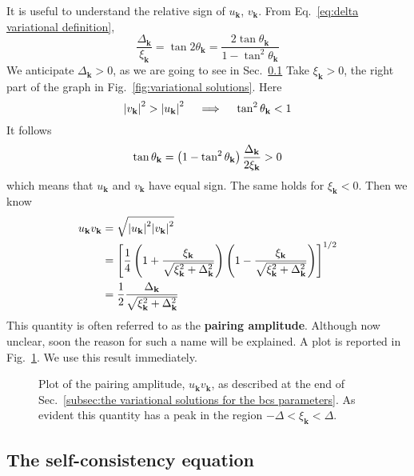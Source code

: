 It is useful to understand the relative sign of $u_\mathbf{k}$, $v_\mathbf{k}$. From Eq.~\eqref{eq:delta variational definition},
\[
	\frac{\Delta_\mathbf{k}}{\xi_\mathbf{k}} = \tan 2\theta_\mathbf{k} = \frac{2 \tan\theta_\mathbf{k}}{1 - \tan^2\theta_\mathbf{k}}
\]
We anticipate $\Delta_\mathbf{k} > 0$, as we are going to see in Sec.~\ref{subsec:the self consistency equation} Take $\xi_\mathbf{k}>0$, the right part of the graph in Fig.~\ref{fig:variational solutions}. Here
\[
	\abs{v_\mathbf{k}}^2 > \abs{u_\mathbf{k}}^2
	\quad\implies\quad
	\tan^2\theta_\mathbf{k} < 1
\]
It follows
\[
	\tan\theta_\mathbf{k} = \left({1-\tan^2\theta_\mathbf{k}}\right) \frac{\Delta_\mathbf{k}}{2\xi_\mathbf{k}} > 0
\]
which means that $u_\mathbf{k}$ and $v_\mathbf{k}$ have equal sign. The same holds for $\xi_\mathbf{k}<0$. Then we know
\begin{align}
	u_\mathbf{k} v_\mathbf{k} &= \sqrt{\abs{u_\mathbf{k}}^2 \abs{v_\mathbf{k}}^2} \nonumber \\
	&= \left[{\frac{1}{4} \left({1 + \frac{\xi_\mathbf{k}}{\sqrt{\xi_\mathbf{k}^2 + \Delta_\mathbf{k}^2}}}\right) \left({1 - \frac{\xi_\mathbf{k}}{\sqrt{\xi_\mathbf{k}^2 + \Delta_\mathbf{k}^2}}}\right) }\right]^{1/2} \nonumber \\
	&= \frac{1}{2} \frac{\Delta_\mathbf{k}}{\sqrt{\xi_\mathbf{k}^2 + \Delta_\mathbf{k}^2}} \label{eq:pairing amplitude vk uk}
\end{align}
This quantity is often referred to as the \textbf{pairing amplitude}. Although now unclear, soon the reason for such a name will be explained. A plot is reported in Fig.~\ref{fig:variational solutions pairing amplitude}.
We use this result immediately.

\begin{figure}
	\centering
	
	\caption{Plot of the pairing amplitude, $u_\mathbf{k} v_\mathbf{k}$, as described at the end of Sec.~\ref{subsec:the variational solutions for the bcs parameters}. As evident this quantity has a peak in the region $-\Delta < \xi_\mathbf{k} < \Delta$.}
	\label{fig:variational solutions pairing amplitude}
\end{figure}


\subsection{The self-consistency equation}\label{subsec:the self consistency equation}

